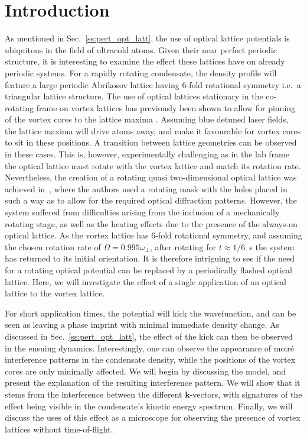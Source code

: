 \section{Introduction}

As mentioned in Sec.~\ref{ss:pert_opt_latt}, the use of optical lattice potentials is ubiquitous in the field of ultracold atoms. Given their near perfect periodic structure, it is interesting to examine the effect these lattices have on already periodic systems. For a rapidly rotating condensate, the density profile will feature a large periodic Abrikosov lattice having $6$-fold rotational symmetry i.e.\ a triangular lattice structure. The use of optical lattices stationary in the co-rotating frame on vortex lattices has previously been shown to allow for pinning of the vortex cores to the lattice maxima \cite{OL:Reijnders_prl_2004,Vtx:Tung_prl_2006}. Assuming blue detuned laser fields, the lattice maxima will drive atoms away, and make it favourable for vortex cores to sit in these positions. A transition between lattice geometries can be observed in these cases. This is, however, experimentally challenging as in the lab frame the optical lattice must rotate with the vortex lattice and match its rotation rate. Nevertheless, the creation of a rotating quasi two-dimensional optical lattice was achieved in~\cite{Vtx:Tung_prl_2006}, where the authors used a rotating mask with the holes placed in such a way as to allow for the required optical diffraction patterns. However, the system suffered from difficulties arising from the inclusion of a mechanically rotating stage, as well as the heating effects due to the presence of the always-on optical lattice. As the vortex lattice has 6-fold rotational symmetry, and assuming the chosen rotation rate of $\Omega = 0.995\omega_\perp$, after rotating for
$t \approx 1/6$\ s the system has returned to its initial orientation. It is therefore intriguing to see if the need for a rotating optical potential can be replaced by a periodically flashed optical lattice. Here, we will investigate the effect of a single application of an optical lattice to the vortex lattice.

 For short application times, the potential will kick the wavefunction, and can be seen as leaving a phase imprint with minimal immediate density change. As discussed in Sec.~\ref{ss:pert_opt_latt}, the effect of the kick can then be observed in the ensuing dynamics. Interestingly, one can observe the appearance of moir\'e interference patterns in the condensate density, while the positions of the vortex cores are only minimally affected. We will begin by discussing the model, and present the explanation of the resulting interference pattern. We will show that it stems from the interference between the different $\mathbf{k}$-vectors, with signatures of the effect being visible in the condensate's kinetic energy spectrum. Finally, we will discuss the uses of this effect as a microscope for observing the presence of vortex lattices without time-of-flight.


